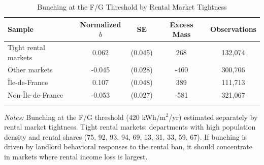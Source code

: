 \begin{table}[htbp]
\centering
\caption{Bunching at the F/G Threshold by Rental Market Tightness}
\label{tab:geography}
\begin{tabular}{lcccc}
\hline\hline
Sample & Normalized $b$ & SE & Excess Mass & Observations \\
\hline
\addlinespace
Tight rental markets & 0.062 & (0.045) & 268 & 132,074 \\
Other markets & -0.045 & (0.028) & -460 & 300,706 \\
\addlinespace
\^Ile-de-France & 0.107 & (0.048) & 389 & 111,713 \\
Non-\^Ile-de-France & -0.053 & (0.027) & -581 & 321,067 \\
\addlinespace
\hline\hline
\end{tabular}
\begin{tablenotes}
\small
\item \textit{Notes:} Bunching at the F/G threshold (420 kWh/m$^2$/yr) estimated separately by rental market tightness. Tight rental markets: departments with high population density and rental shares (75, 92, 93, 94, 69, 13, 31, 33, 59, 67). If bunching is driven by landlord behavioral responses to the rental ban, it should concentrate in markets where rental income loss is largest.
\end{tablenotes}
\end{table}
